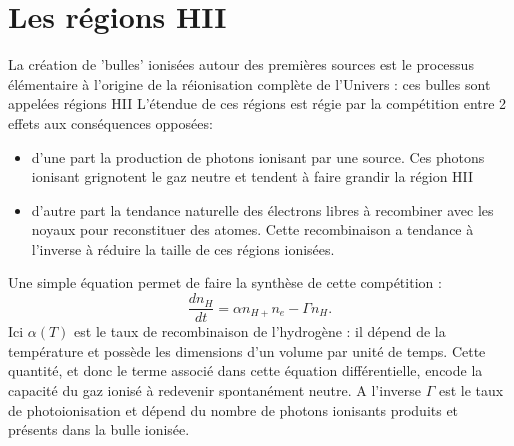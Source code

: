 \section{Les régions HII}
La création de 'bulles' ionisées autour des premières sources est le processus élémentaire à l'origine de la réionisation complète de l'Univers : ces bulles sont appelées régions HII L'étendue de ces régions est régie par la compétition entre 2 effets aux conséquences opposées:
\begin{itemize}
\item d'une part la production de photons ionisant par une source. Ces photons ionisant grignotent le gaz neutre et tendent à faire grandir la région HII
\item d'autre part la tendance naturelle des électrons libres à recombiner avec les noyaux pour reconstituer des atomes. Cette recombinaison a tendance à l'inverse à réduire la taille de ces régions ionisées.
\end{itemize}
Une simple équation permet de faire la synthèse de cette compétition :
\begin{equation}
\frac{d n_H}{dt}=\alpha n_{H+}n_e -\Gamma n_H.
\end{equation}
Ici $\alpha(T)$ est le taux de recombinaison de l'hydrogène : il dépend de la température et possède les dimensions d'un volume par unité de temps. Cette quantité, et donc le terme associé dans cette équation différentielle, encode la capacité du gaz ionisé à redevenir spontanément neutre.  A l'inverse $\Gamma$ est le taux de photoionisation et dépend du nombre de photons ionisants produits et présents dans la bulle ionisée.

